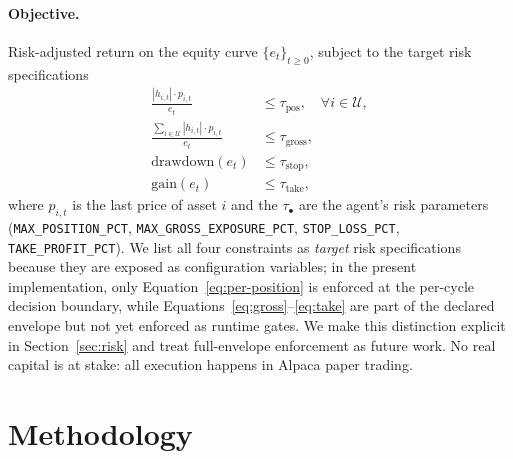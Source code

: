 \documentclass{article}
\begin{document}
\paragraph{Objective.} Risk-adjusted return on the equity curve $\{e_t\}_{t \geq 0}$, subject to the target risk specifications
\begin{align}
  \frac{|h_{i,t}| \cdot p_{i,t}}{e_t} &\leq \tau_{\text{pos}}, \quad \forall i \in \mathcal{U}, \label{eq:per-position} \\
  \frac{\sum_{i \in \mathcal{U}} |h_{i,t}| \cdot p_{i,t}}{e_t} &\leq \tau_{\text{gross}}, \label{eq:gross} \\
  \mathrm{drawdown}(e_t) &\leq \tau_{\text{stop}}, \label{eq:stop} \\
  \mathrm{gain}(e_t) &\leq \tau_{\text{take}}, \label{eq:take}
\end{align}
where $p_{i,t}$ is the last price of asset $i$ and the $\tau_{\bullet}$ are the agent\textquoteright s risk parameters (\texttt{MAX\_POSITION\_PCT}, \texttt{MAX\_GROSS\_EXPOSURE\_PCT}, \texttt{STOP\_LOSS\_PCT}, \texttt{TAKE\_PROFIT\_PCT}). We list all four constraints as \emph{target} risk specifications because they are exposed as configuration variables; in the present implementation, only Equation~\eqref{eq:per-position} is enforced at the per-cycle decision boundary, while Equations~\eqref{eq:gross}--\eqref{eq:take} are part of the declared envelope but not yet enforced as runtime gates. We make this distinction explicit in Section~\ref{sec:risk} and treat full-envelope enforcement as future work. No real capital is at stake: all execution happens in Alpaca paper trading.

\section{Methodology}
\end{document}
